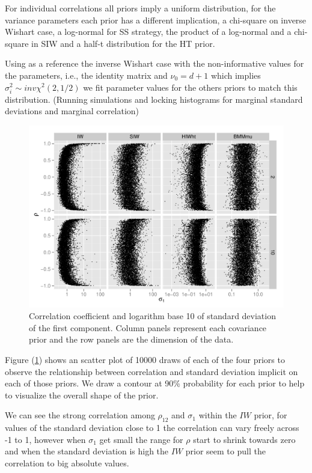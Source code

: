 \documentclass{article}
\begin{document}
For individual correlations all priors imply a uniform distribution, for the variance parameters each prior has a different implication, a chi-square on inverse Wishart case, a log-normal for SS strategy, the product of a log-normal and a chi-square in SIW and a half-t distribution for the HT prior.  

Using as a reference the inverse Wishart case with the non-informative values for the parameters, i.e., the identity matrix and $\nu_0=d+1$ which implies $\sigma_i^2 \sim inv\chi^2( 2, 1/2)$ we fit parameter values for the others priors to match this distribution. (Running simulations and locking histograms for marginal standard deviations and marginal correlation) 
\begin{figure}[htbp]
\begin{center}
 \includegraphics[width=\textwidth ]{priorsim2d} 
 \vspace{-.5in}
\caption{Correlation coefficient and  logarithm base 10 of standard deviation of the first component. Column panels represent each covariance prior and the row panels are the dimension of the data.  \label{priorsim}}
\end{center}
\end{figure}

 Figure (\ref{priorsim}) shows an scatter plot of 10000 draws of each of the four priors to observe the relationship between correlation and standard deviation implicit on each of those priors. We draw a contour at 90\% probability for each prior to help to visualize the overall shape of the prior.  

We can see the strong correlation among $\rho_{12}$ and $\sigma_1$ within the $IW$ prior, for values of the standard deviation close to 1 the correlation can vary freely across -1 to 1, however when $\sigma_1$ get small the range for $\rho$ start to shrink towards zero and when the standard deviation is high the $IW$ prior seem to pull the correlation to big absolute values. 
\end{document}
